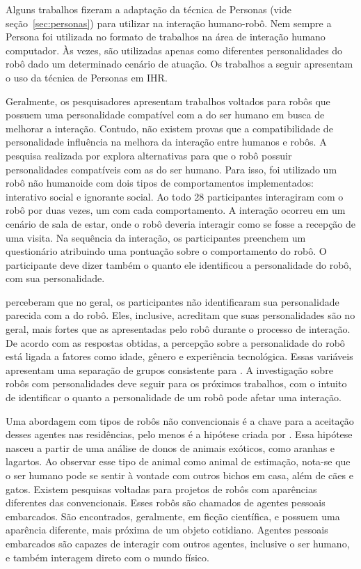 Alguns trabalhos fizeram a adaptação da técnica de Personas (vide seção~\ref{sec:personas}) para utilizar na interação humano-robô. Nem sempre a Persona foi utilizada no formato de trabalhos na área de interação humano computador. Às vezes, são utilizadas apenas como diferentes personalidades do robô dado um determinado cenário de atuação. Os trabalhos a seguir apresentam o uso da técnica de Personas em IHR.

Geralmente, os pesquisadores apresentam trabalhos voltados para robôs que possuem uma personalidade compatível com a do ser humano em busca de melhorar a interação. Contudo, não existem provas que a compatibilidade de personalidade influência na melhora da interação entre humanos e robôs. A pesquisa realizada por \textcite{woods:2005} explora alternativas para que o robô possuir personalidades compatíveis com as do ser humano. Para isso, foi utilizado um robô não humanoide com dois tipos de comportamentos implementados: interativo social e ignorante social. Ao todo 28 participantes interagiram com o robô por duas vezes, um com cada comportamento. A interação ocorreu em um cenário de sala de estar, onde o robô deveria interagir como se fosse a recepção de uma visita. Na sequência da interação, os participantes preenchem um questionário atribuindo uma pontuação sobre o comportamento do robô. O participante deve dizer também o quanto ele identificou a personalidade do robô, com sua personalidade.

\textcite{woods:2005} perceberam que no geral, os participantes não identificaram sua personalidade parecida com a do robô. Eles, inclusive, acreditam que suas personalidades são no geral, mais fortes que as apresentadas pelo robô durante o processo de interação. De acordo com as respostas obtidas, a percepção sobre a personalidade do robô está ligada a fatores como idade, gênero e experiência tecnológica. Essas variáveis apresentam uma separação de grupos consistente para \textcite{woods:2005}. A investigação sobre robôs com personalidades deve seguir para os próximos trabalhos, com o intuito de identificar o quanto a personalidade de um robô pode afetar uma interação.

Uma abordagem com tipos de robôs não convencionais é a chave para a aceitação desses agentes nas residências, pelo menos é a hipótese criada por \textcite{ljungblad:2006}. Essa hipótese nasceu a partir de uma análise de donos de animais exóticos, como aranhas e lagartos. Ao observar esse tipo de animal como animal de estimação, nota-se que o ser humano pode se sentir à vontade com outros bichos em casa, além de cães e gatos. Existem pesquisas voltadas para projetos de robôs com aparências diferentes das convencionais. Esses robôs são chamados de agentes pessoais embarcados. São encontrados, geralmente, em ficção científica, e possuem uma aparência diferente, mais próxima de um objeto cotidiano. Agentes pessoais embarcados são capazes de interagir com outros agentes, inclusive o ser humano, e também interagem direto com o mundo físico.

